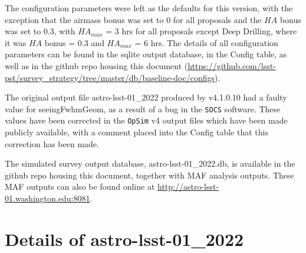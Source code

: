 \documentclass[DM,lsstdraft,authoryear,toc]{lsstdoc}
\newcommand{\opsim}{\texttt{OpSim}\xspace}
\newcommand{\socs}{\texttt{SOCS}\xspace}
\begin{document}
The configuration parameters were left as the defaults for this version, with the exception that the airmass bonus was set to 0 for all proposals and the $HA$ bonus was set to 0.3, with $HA_{max}$ = 3 hrs for all proposals except Deep Drilling, where it was $HA$ bonus = 0.3 and $HA_{max}$ = 6 hrs. The details of all configuration parameters can be found in the sqlite output database, in the Config table, as well as in the github repo housing this document (\url{https://github.com/lsst-pst/survey_strategy/tree/master/db/baseline-doc/configs}).

The original output file astro-lsst-01\_2022 produced by v4.1.0.10 had a faulty value for seeingFwhmGeom, as a result of a bug in the \socs software. These values have been corrected in the \opsim v4 output files which have been made publicly available, with a comment placed into the Config table that this correction has been made.

The simulated survey output database, astro-lsst-01\_2022.db, is available in the github repo housing this document, together with MAF analysis outputs. These MAF outputs can also be found online at \url{http://astro-lsst-01.washington.edu:8081}.

\section{Details of astro-lsst-01\_2022}
\end{document}
